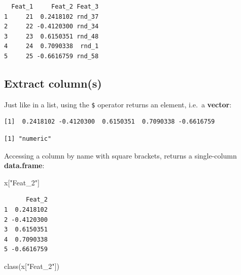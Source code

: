 \documentclass[
]{book}
\newenvironment{Shaded}{\begin{snugshade}}{\end{snugshade}}
\newcommand{\FunctionTok}[1]{\textcolor[rgb]{0.00,0.00,0.00}{#1}}
\newcommand{\NormalTok}[1]{#1}
\newcommand{\SpecialCharTok}[1]{\textcolor[rgb]{0.00,0.00,0.00}{#1}}
\newcommand{\StringTok}[1]{\textcolor[rgb]{0.31,0.60,0.02}{#1}}
\begin{document}
\begin{verbatim}
  Feat_1     Feat_2 Feat_3
1     21  0.2418102 rnd_37
2     22 -0.4120300 rnd_34
3     23  0.6150351 rnd_48
4     24  0.7090338  rnd_1
5     25 -0.6616759 rnd_58
\end{verbatim}

\hypertarget{extract-columns}{%
\subsection{Extract column(s)}\label{extract-columns}}

Just like in a list, using the \texttt{\$} operator returns an element, i.e.~a \textbf{vector}:

\begin{Shaded}
\end{Shaded}

\begin{verbatim}
[1]  0.2418102 -0.4120300  0.6150351  0.7090338 -0.6616759
\end{verbatim}

\begin{Shaded}
\end{Shaded}

\begin{verbatim}
[1] "numeric"
\end{verbatim}

Accessing a column by name with square brackets, returns a single-column \textbf{data.frame}:

\begin{Shaded}
\begin{Highlighting}[]
\NormalTok{x[}\StringTok{"Feat\_2"}\NormalTok{]}
\end{Highlighting}
\end{Shaded}

\begin{verbatim}
      Feat_2
1  0.2418102
2 -0.4120300
3  0.6150351
4  0.7090338
5 -0.6616759
\end{verbatim}

\begin{Shaded}
\begin{Highlighting}[]
\FunctionTok{class}\NormalTok{(x[}\StringTok{"Feat\_2"}\NormalTok{])}
\end{Highlighting}
\end{Shaded}
\end{document}
